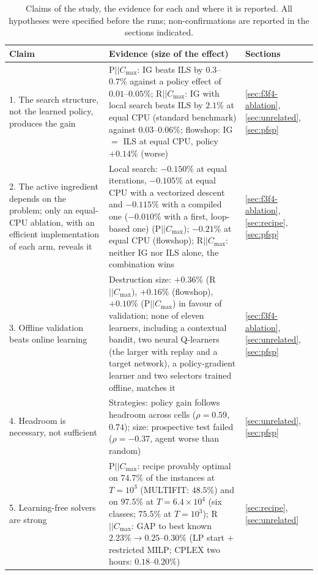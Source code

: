 \begin{table}[t]
\centering
\caption{Claims of the study, the evidence for each and where it is reported. All hypotheses were specified before the runs; non-confirmations are reported in the sections indicated.}
\label{tab:evidence}
{\scriptsize\setlength{\tabcolsep}{3pt}
\begin{tabular}{@{}p{}p{}p{}@{}}
\toprule
Claim & Evidence (size of the effect) & Sections \\
\midrule
1. The search structure, not the learned policy, produces the gain &
P$||C_{\max}$: IG beats ILS by $0.3$--$0.7\%$ against a policy effect of $0.01$--$0.05\%$; R$||C_{\max}$: IG with local search beats ILS by $2.1\%$ at equal CPU (standard benchmark) against $0.03$--$0.06\%$; flowshop: IG $=$ ILS at equal CPU, policy $+0.14\%$ (worse) &
\ref{sec:f3f4-ablation}, \ref{sec:unrelated}, \ref{sec:pfsp} \\[2pt]
2. The active ingredient depends on the problem; only an equal-CPU ablation, with an efficient implementation of each arm, reveals it &
Local search: $-0.150\%$ at equal iterations, $-0.105\%$ at equal CPU with a vectorized descent and $-0.115\%$ with a compiled one ($-0.010\%$ with a first, loop-based one) (P$||C_{\max}$); $-0.21\%$ at equal CPU (flowshop); R$||C_{\max}$: neither IG nor ILS alone, the combination wins &
\ref{sec:f3f4-ablation}, \ref{sec:recipe}, \ref{sec:pfsp} \\[2pt]
3. Offline validation beats online learning &
Destruction size: $+0.36\%$ (R$||C_{\max}$), $+0.16\%$ (flowshop), $+0.10\%$ (P$||C_{\max}$) in favour of validation; none of eleven learners, including a contextual bandit, two neural Q-learners (the larger with replay and a target network), a policy-gradient learner and two selectors trained offline, matches it &
\ref{sec:f3f4-ablation}, \ref{sec:unrelated}, \ref{sec:pfsp} \\[2pt]
4. Headroom is necessary, not sufficient &
Strategies: policy gain follows headroom across cells ($\rho=0.59$, $0.74$); size: prospective test failed ($\rho=-0.37$, agent worse than random) &
\ref{sec:unrelated}, \ref{sec:pfsp} \\[2pt]
5. Learning-free solvers are strong &
P$||C_{\max}$: recipe provably optimal on $74.7\%$ of the instances at $T=10^3$ (MULTIFIT: $48.5\%$) and on $97.5\%$ at $T=6.4\times10^4$ (six classes; $75.5\%$ at $T=10^3$); R$||C_{\max}$: GAP to best known $2.23\%\to0.25$--$0.30\%$ (LP start $+$ restricted MILP; CPLEX two hours: $0.18$--$0.20\%$) &
\ref{sec:recipe}, \ref{sec:unrelated} \\
\bottomrule
\end{tabular}}
\end{table}

